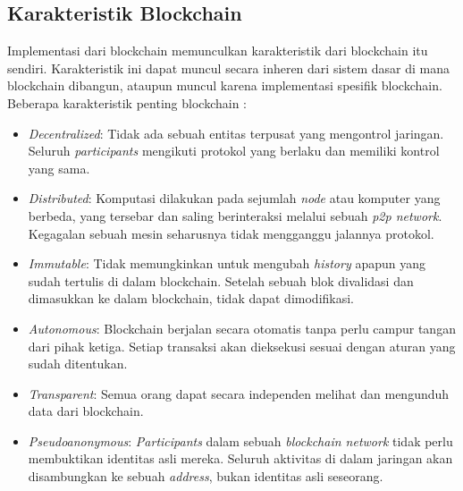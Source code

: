 \subsection{Karakteristik Blockchain}
\label{subsec:karakteristik-blockchain}

Implementasi dari blockchain memunculkan karakteristik dari blockchain itu sendiri. Karakteristik ini dapat muncul secara inheren dari sistem dasar di mana blockchain dibangun, ataupun muncul karena implementasi spesifik blockchain. Beberapa karakteristik penting blockchain \parencite{aimar2023extraction}:

\begin{itemize}
	\item \textit{Decentralized}: Tidak ada sebuah entitas terpusat yang mengontrol jaringan. Seluruh \textit{participants} mengikuti protokol yang berlaku dan memiliki kontrol yang sama.
	\item \textit{Distributed}: Komputasi dilakukan pada sejumlah \textit{node} atau komputer yang berbeda, yang tersebar dan saling berinteraksi melalui sebuah \textit{p2p network}. Kegagalan sebuah mesin seharusnya tidak mengganggu jalannya protokol.
	\item \textit{Immutable}: Tidak memungkinkan untuk mengubah \textit{history} apapun yang sudah tertulis di dalam blockchain. Setelah sebuah blok divalidasi dan dimasukkan ke dalam blockchain, tidak dapat dimodifikasi.
	\item \textit{Autonomous}: Blockchain berjalan secara otomatis tanpa perlu campur tangan dari pihak ketiga. Setiap transaksi akan dieksekusi sesuai dengan aturan yang sudah ditentukan.
	\item \textit{Transparent}: Semua orang dapat secara independen melihat dan mengunduh data dari blockchain.
	\item \textit{Pseudoanonymous}: \textit{Participants} dalam sebuah \textit{blockchain network} tidak perlu membuktikan identitas asli mereka. Seluruh aktivitas di dalam jaringan akan disambungkan ke sebuah \textit{address}, bukan identitas asli seseorang.
\end{itemize}